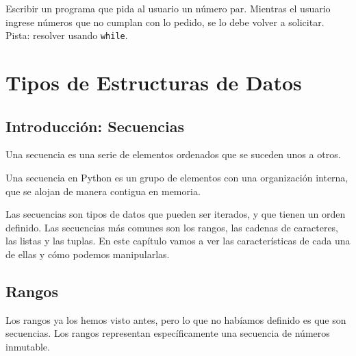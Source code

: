 \documentclass[
  letterpaper,
  DIV=11,
  numbers=noendperiod]{scrreprt}
\begin{document}
\begin{tcolorbox}[enhanced jigsaw, colframe=quarto-callout-warning-color-frame, opacityback=0, opacitybacktitle=0.6, bottomrule=.15mm, toprule=.15mm, coltitle=black, breakable, colback=white, leftrule=.75mm, titlerule=0mm, bottomtitle=1mm, toptitle=1mm, rightrule=.15mm, title=\textcolor{quarto-callout-warning-color}{\faExclamationTriangle}\hspace{0.5em}{Ejercicio Desafío}, arc=.35mm, left=2mm, colbacktitle=quarto-callout-warning-color!10!white]

Escribir un programa que pida al usuario un número par. Mientras el
usuario ingrese números que no cumplan con lo pedido, se lo debe volver
a solicitar.\\
Pista: resolver usando \texttt{while}.

\end{tcolorbox}


\hypertarget{tipos-de-estructuras-de-datos}{%
\chapter{Tipos de Estructuras de
Datos}\label{tipos-de-estructuras-de-datos}}

\hypertarget{introducciuxf3n-secuencias}{%
\section{Introducción: Secuencias}\label{introducciuxf3n-secuencias}}

Una secuencia es una serie de elementos ordenados que se suceden unos a
otros.

Una secuencia en Python es un grupo de elementos con una organización
interna, que se alojan de manera contigua en memoria.

Las secuencias son tipos de datos que pueden ser iterados, y que tienen
un orden definido. Las secuencias más comunes son los rangos, las
cadenas de caracteres, las listas y las tuplas. En este capítulo vamos a
ver las características de cada una de ellas y cómo podemos
manipularlas.

\hypertarget{rangos}{%
\section{Rangos}\label{rangos}}

Los rangos ya los hemos visto antes, pero lo que no habíamos definido es
que son secuencias. Los rangos representan específicamente una secuencia
de números inmutable.
\end{document}
